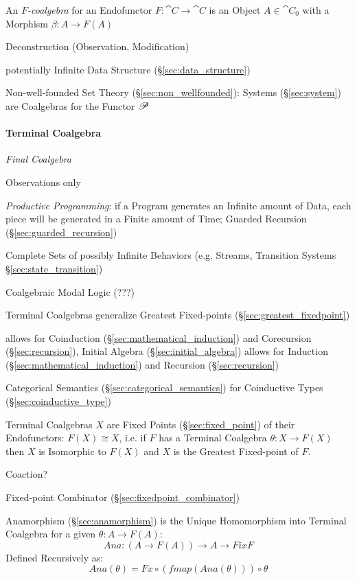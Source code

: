 An \emph{$F$-coalgebra} for an Endofunctor $F : \cat{C} \rightarrow
\cat{C}$ is an Object $A \in \cat{C}_0$ with a Morphism $\beta : A
\rightarrow F(A)$ \cite{corfield08}

Deconstruction (Observation, Modification)

potentially Infinite Data Structure (\S\ref{sec:data_structure})

Non-well-founded Set Theory (\S\ref{sec:non_wellfounded}): Systems
(\S\ref{sec:system}) are Coalgebras for the Functor $\mathscr{P}$



\paragraph{Terminal Coalgebra}\label{sec:terminal_coalgebra}\hfill

\emph{Final Coalgebra}

Observations only

\emph{Productive Programming}: if a Program generates an Infinite
amount of Data, each piece will be generated in a Finite amount of
Time; Guarded Recursion (\S\ref{sec:guarded_recursion})
\cite{atkey-mcbride13}

Complete Sets of possibly Infinite Behaviors (e.g. Streams, Transition
Systems \S\ref{sec:state_transition})

Coalgebraic Modal Logic (???)

Terminal Coalgebras generalize Greatest Fixed-points
(\S\ref{sec:greatest_fixedpoint}) \cite{rutten00}

allows for Coinduction (\S\ref{sec:mathematical_induction}) and
Corecursion (\S\ref{sec:recursion}), Initial Algebra
(\S\ref{sec:initial_algebra}) allows for Induction
(\S\ref{sec:mathematical_induction}) and Recursion
(\S\ref{sec:recursion})

Categorical Semantics (\S\ref{sec:categorical_semantics}) for
Coinductive Types (\S\ref{sec:coinductive_type})

Terminal Coalgebras $X$ are Fixed Points (\S\ref{sec:fixed_point}) of
their Endofunctors: $F(X) \cong X$, i.e. if $F$ has a Terminal
Coalgebra $\theta : X \rightarrow F(X)$ then $X$ is Isomorphic to
$F(X)$ and $X$ is the Greatest Fixed-point of $F$.

Coaction?

Fixed-point Combinator (\S\ref{sec:fixedpoint_combinator})

Anamorphism (\S\ref{sec:anamorphism}) is the Unique Homomorphism into
Terminal Coalgebra for a given $\theta : A \rightarrow F(A)$:
\[
  Ana : (A \rightarrow F (A)) \rightarrow A \rightarrow Fix F
\]
Defined Recursively as:
\[
  Ana (\theta) = Fx \circ (fmap (Ana (\theta))) \circ \theta
\]

